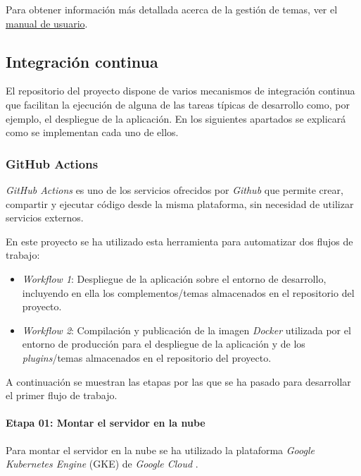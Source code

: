 Para obtener información más detallada acerca de la gestión de temas,
ver el
\href{https://tfg-ceniehariadne.readthedocs.io/es/latest/anexos/E_Manual_usuario.html\#manual-de-usuario}{manual
de usuario}.

\subsection{Integración continua}

El repositorio del proyecto dispone de varios mecanismos de integración
continua que facilitan la ejecución de alguna de las tareas típicas de
desarrollo como, por ejemplo, el despliegue de la aplicación. En los
siguientes apartados se explicará como se implementan cada uno de ellos.

\subsubsection{GitHub Actions}

\emph{GitHub Actions} es uno de los servicios ofrecidos por
\emph{Github} que permite crear, compartir y ejecutar código desde la
misma plataforma, sin necesidad de utilizar servicios externos.

En este proyecto se ha utilizado esta herramienta para automatizar dos
flujos de trabajo:

\begin{itemize}
\tightlist
\item
  \emph{Workflow 1}: Despliegue de la aplicación sobre el entorno de
  desarrollo, incluyendo en ella los complementos/temas almacenados en
  el repositorio del proyecto.
\item
  \emph{Workflow 2}: Compilación y publicación de la imagen
  \emph{Docker} utilizada por el entorno de producción para el
  despliegue de la aplicación y de los \emph{plugins}/temas almacenados
  en el repositorio del proyecto.
\end{itemize}

A continuación se muestran las etapas por las que se ha pasado para
desarrollar el primer flujo de trabajo.

\paragraph{Etapa 01: Montar el servidor en la nube}

Para montar el servidor en la nube se ha utilizado la plataforma
\emph{Google Kubernetes Engine} (GKE) de \emph{Google Cloud} \cite{cloud:web}.

